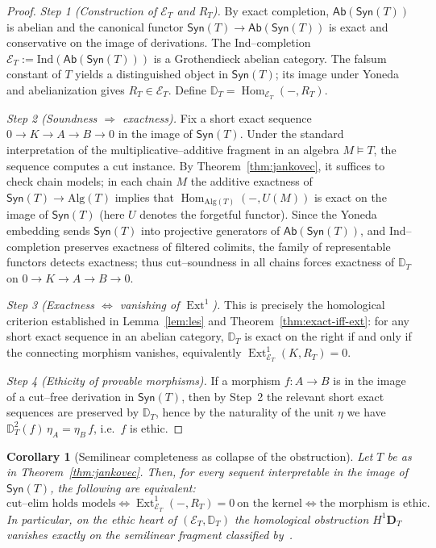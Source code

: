 \documentclass[12pt]{article}
\newcommand{\Syn}{\mathsf{Syn}}
\newcommand{\Alg}{\mathrm{Alg}}
\newcommand{\E}{\mathcal{E}}
\newcommand{\Ab}{\mathsf{Ab}}
\newcommand{\Hom}{\operatorname{Hom}}
\newcommand{\Ext}{\operatorname{Ext}}
\theoremstyle{plain}
\newtheorem{corollary}[theorem]{Corollary}
\theoremstyle{definition}
\theoremstyle{remark}
\numberwithin{equation}{section}
\begin{document}
\begin{proof}
\emph{Step 1 (Construction of $\E_T$ and $R_T$).}
By exact completion, $\Ab(\Syn(T))$ is abelian and the canonical functor $\Syn(T)\to \Ab(\Syn(T))$ is exact and conservative on the image of derivations. The Ind–completion $\E_T:=\mathrm{Ind}(\Ab(\Syn(T)))$ is a Grothendieck abelian category. The falsum constant of $T$ yields a distinguished object in $\Syn(T)$; its image under Yoneda and abelianization gives $R_T\in \E_T$. Define $\mathbb D_T=\Hom_{\E_T}(-,R_T)$.

\emph{Step 2 (Soundness $\Rightarrow$ exactness).}
Fix a short exact sequence $0\to K\to A\to B\to 0$ in the image of $\Syn(T)$. Under the standard interpretation of the multiplicative–additive fragment in an algebra $M\models T$, the sequence computes a cut instance. By Theorem~\ref{thm:jankovec}, it suffices to check chain models; in each chain $M$ the additive exactness of $\Syn(T)\to \Alg(T)$ implies that $\Hom_{\Alg(T)}(-,U(M))$ is exact on the image of $\Syn(T)$ (here $U$ denotes the forgetful functor). Since the Yoneda embedding sends $\Syn(T)$ into projective generators of $\Ab(\Syn(T))$, and Ind–completion preserves exactness of filtered colimits, the family of representable functors detects exactness; thus cut–soundness in all chains forces exactness of $\mathbb D_T$ on $0\to K\to A\to B\to 0$.

\emph{Step 3 (Exactness $\Leftrightarrow$ vanishing of $\Ext^1$).}
This is precisely the homological criterion established in Lemma~\ref{lem:les} and Theorem~\ref{thm:exact-iff-ext}: for any short exact sequence in an abelian category, $\mathbb D_T$ is exact on the right if and only if the connecting morphism vanishes, equivalently $\Ext^1_{\E_T}(K,R_T)=0$.

\emph{Step 4 (Ethicity of provable morphisms).}
If a morphism $f:A\to B$ is in the image of a cut–free derivation in $\Syn(T)$, then by Step~2 the relevant short exact sequences are preserved by $\mathbb D_T$, hence by the naturality of the unit $\eta$ we have $\mathbb D_T^2(f)\,\eta_A=\eta_B\,f$, i.e.\ $f$ is ethic.
\end{proof}

\begin{corollary}[Semilinear completeness as collapse of the obstruction]\label{cor:semilinear-collapse}
Let $T$ be as in Theorem~\ref{thm:jankovec}. Then, for every sequent interpretable in the image of $\Syn(T)$, the following are equivalent:
\[
\text{cut–elim holds models} \Longleftrightarrow
\Ext^1_{\E_T}(-,R_T)=0\ \text{on the kernel} \Longleftrightarrow
\text{the morphism is ethic.}
\]
In particular, on the ethic heart of $(\E_T,\mathbb D_T)$ the homological obstruction $H^1\mathbf D_T$ vanishes exactly on the semilinear fragment classified by~\cite{Jankovec2025}.
\end{corollary}
\end{document}

